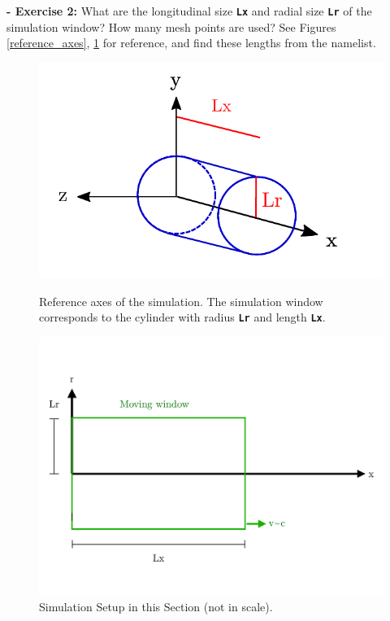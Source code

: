 \documentclass{article}
\newcommand{\commandline}[1]{\texttt{\textbf{#1}}}
\begin{document}
\textbf{ - Exercise 2:} What are the longitudinal size \commandline{Lx} and radial size \commandline{Lr} of the simulation window? How many mesh points are used? See Figures \ref{reference_axes}, \ref{Schema0} for reference,  and find these lengths from the namelist.

\begin{figure}[!htb]
   \begin{minipage}{0.35\textwidth}
     \centering
     \includegraphics[width=1\linewidth]{Reference.pdf}
     \caption{Reference axes of the simulation. The simulation window corresponds to the cylinder with radius \commandline{Lr} and length \commandline{Lx}. }\label{reference_axes}
   \end{minipage}\hfill
   \begin{minipage}{0.65\textwidth}
     \centering
     \includegraphics[width=1\linewidth]{Schema_Simulation_0.pdf}
     \caption{Simulation Setup in this Section (not in scale).}\label{Schema0}
   \end{minipage}
\end{figure}
\end{document}
